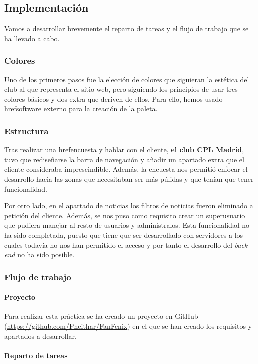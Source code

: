 \documentclass[10pt, spanish, pdftex]{template/UC3M_document}
\begin{document}
\subsection{Implementación}
Vamos a desarrollar brevemente el reparto de tareas y el flujo de trabajo que se ha llevado a cabo.
\subsubsection{Colores}\label{paleta}
Uno de los primeros pasos fue la elección de colores que siguieran la estética del club al que representa el sitio web, pero siguiendo los principios de usar tres colores básicos y dos extra que deriven de ellos. Para ello, hemos usado href{}{software externo} para la creación de la paleta.

\subsubsection{Estructura}
Tras realizar una href{}{encuesta} y hablar con el cliente, \textbf{el club CPL Madrid}, tuvo que rediseñarse la barra de navegación y añadir un apartado extra que el cliente consideraba imprescindible. Además, la encuesta nos permitió enfocar el desarrollo hacia las zonas que necesitaban ser más púlidas y que tenían que tener funcionalidad.

Por otro lado, en el apartado de noticias los filtros de noticias fueron eliminado a petición del cliente. Además, se nos puso como requisito crear un superusuario que pudiera manejar al resto de usuarios y administralos. Esta funcionalidad no ha sido completada, puesto que tiene que ser desarrollado con servidores a los cuales todavía no nos han permitido el acceso y por tanto el desarrollo del \textit{back-end} no ha sido posible.

\subsubsection{Flujo de trabajo}
\paragraph{Proyecto}


Para realizar esta práctica se ha creado un proyecto en GitHub (\url{https://github.com/Pheithar/FanFenix}) en el que se han creado los requisitos y apartados a desarrollar.
\paragraph{Reparto de tareas}
\end{document}
